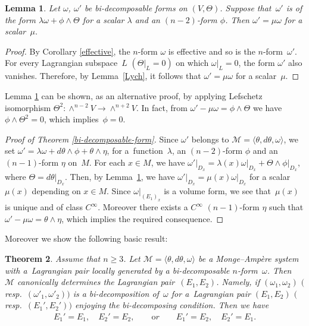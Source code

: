 \documentclass[11pt]{article}
\newtheorem{Th}{Theorem}[section]
\newtheorem{Lem}[Th]{Lemma}
{ \theoremstyle{definition}
\newtheorem{Def}[Th]{Definition}
\newtheorem{Rem}[Th]{Remark}
\newtheorem{Ex}[Th]{Example}}
\begin{document}
\begin{Lem}
\label{bi-decomposable2}
Let $\omega$, ${\omega}'$ be bi-decomposable forms on $(V, \Theta)$.
Suppose that~${\omega}'$ is of the form
$\lambda \omega+\phi \wedge \Theta$
for a scalar $\lambda$ and an $(n-2)$-form $\phi$.
Then ${\omega}' = \mu\omega$ for a scalar~$\mu$.
\end{Lem}

\begin{proof}
By Corollary \ref{effective}, the $n$-form $\omega$ is ef\/fective
and so is the $n$-form~${\omega}'$.
For every Lagrangian subspace~$L$ $(\Theta\vert_L = 0)$ on which
$\omega\vert_L = 0$,
the form $\omega'$ also vanishes.
Therefore, by Lemma~\ref{Lych},
it follows that
$\omega' =\mu{\omega}$
for a scalar~$\mu$.
\end{proof}

\begin{Rem}
Lemma \ref{bi-decomposable2} can be shown, as an alternative proof, by
applying Lefschetz isomorphism $\Theta^2\colon
\wedge^{n-2} V \to \wedge^{n+2} V$. In fact, from ${\omega}' - \mu\omega = \phi \wedge \Theta$
we have $\phi\wedge \Theta^2 = 0$, which implies~$\phi = 0$.
\end{Rem}


\begin{proof}[Proof of Theorem \ref{bi-decomposable-form}]
Since $\omega'$ belongs to ${\mathcal M} = \langle \theta, d\theta, \omega
\rangle$,
we set $\omega' = \lambda\omega +  d\theta\wedge\phi + \theta\wedge \eta$,
for a~function~$\lambda$, an $(n-2)$-form $\phi$ and an $(n-1)$-form $\eta$
on~$M$.
For each $x \in M$, we have
$\omega'\vert_{D_x} = \lambda(x)\omega\vert_{D_x} +
\Theta\wedge\phi\vert_{D_x}$,
where $\Theta = d\theta\vert_{D_x}$.
Then, by Lemma~\ref{bi-decomposable2}, we have
$\omega'\vert_{D_x} = \mu(x)\omega\vert_{D_x}$ for a scalar~$\mu(x)$
depending on $x \in M$.
Since $\omega\vert_{(E_1)_x}$ is a volume form, we see that~$\mu(x)$
is unique and
of class $C^\infty$. Moreover there exists a $C^\infty$ $(n-1)$-form $\eta$
such that $\omega' - \mu\omega = \theta \wedge \eta$, which implies
the required consequence.
\end{proof}


Moreover we show the following basic result:
\begin{Th}\label{Uniqueness}
Assume that $n\geq 3$.
Let
$\mathcal{M}=
\langle \theta, d\theta, \omega \rangle$ be
a Monge--Amp{\`e}re system
with a~Lag\-rangian pair locally generated by a bi-decomposable
$n$-form~$\omega$. Then~$\mathcal{M}$
canonically determines the Lagrangian pair~$(E_1,E_2)$.
Namely, if $(\omega_1, \omega_2)$
$($resp.\ $(\omega'_1, \omega'_2))$
is a bi-decomposition of~$\omega$ for
a~Lag\-rangian pair $(E_1,E_2)$ $($resp.~$(E_1', E_2'))$
enjoying the bi-decomposing condition.
Then we have
\begin{gather*}
E_1'=E_1,\quad  E_2'=E_2, \qquad {\mathrm or} \qquad
E_1' = E_2, \quad  E_2' = E_1.
\end{gather*}
\end{Th}
\end{document}
